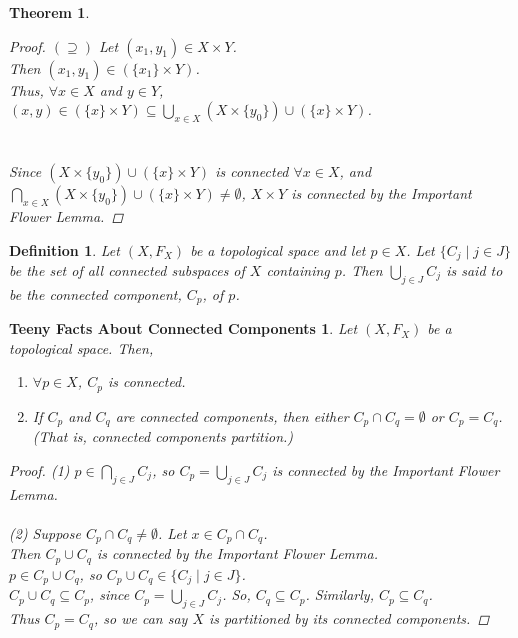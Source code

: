 \documentclass[10pt,reqno]{amsart}
\newtheorem*{Important Flower Lemma}{Important Flower Lemma}
\newtheorem*{Theorem}{Theorem}
\newtheorem*{Definition}{Definition}
\newtheorem*{Teeny Facts About Connected Components}{Teeny Facts About Connected Components}
\begin{document}
\begin{Theorem}
\begin{proof}
$(\supseteq)$ Let $(x_1, y_1) \in X\times Y$.\\
Then $(x_1, y_1) \in (\{x_1\}\times Y)$.\\
Thus, $\forall x\in X$ and $y\in Y$, $(x,y) \in (\{x\} \times Y) \subseteq {\displaystyle\bigcup_{x \in X}(X\times \{y_0\}) \cup (\{x\} \times Y)}$.\\\\\\
Since $(X\times \{y_0\}) \cup (\{x\} \times Y)$ is connected $\forall x\in X$, and $\displaystyle{\bigcap_{x \in X}(X\times \{y_0\}) \cup (\{x\} \times Y)}\neq \emptyset$, $X\times Y$ is connected by the Important Flower Lemma.
\end{proof}
\end{Theorem}
\vspace{.1in}
\begin{Definition} Let $(X, F_X)$ be a topological space and let $p\in X$. Let $\{C_j\mid j\in J\}$ be the set of all connected subspaces of $X$ containing $p$. Then ${\displaystyle\bigcup_{j\in J}C_j}$ is said to be the {\rm connected component}, $C_p$, of $p$.
\end{Definition}
\begin{Teeny Facts About Connected Components}
Let $(X, F_X)$ be a topological space. Then,
\begin{enumerate}
\item $\forall p \in X$, $C_p$ is connected.
\item If $C_p$ and $C_q$ are connected components, then either $C_p\cap C_q = \emptyset$ or $C_p = C_q$. (That is, connected components partition.)
\end{enumerate}
\begin {proof}
\item(1) $p\in {\displaystyle\bigcap_{j\in J} C_j}$, so $C_p = {\displaystyle\bigcup_{j\in J} C_j}$ is connected by the Important Flower Lemma.\\\\
(2) Suppose $C_p \cap C_q \neq \emptyset$.
Let $x\in C_p \cap C_q$.\\
Then $C_p \cup C_q$ is connected by the Important Flower Lemma.\\
$p\in C_p \cup C_q$, so $C_p \cup C_q \in \{C_j\mid j\in J\}$.\\
$C_p \cup C_q \subseteq C_p$, since $C_p =  {\displaystyle\bigcup_{j\in J} C_j}$. So, $C_q \subseteq C_p$. Similarly, $C_p \subseteq C_q$.\\
Thus $C_p = C_q$, so we can say $X$ is partitioned by its connected components.
\end{proof}
\end{Teeny Facts About Connected Components}
\end{document}
